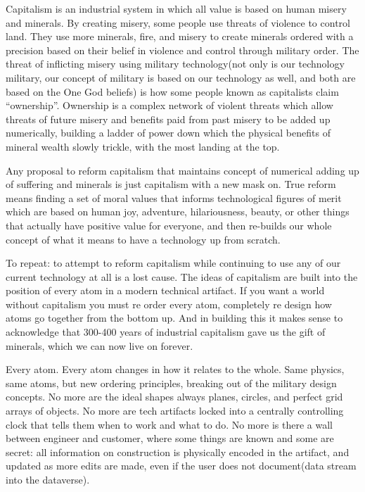 Capitalism is an industrial system in which all value is based on human
misery and minerals. By creating misery, some people use threats of
violence to control land. They use more minerals, fire, and misery to
create minerals ordered with a precision based on their belief in
violence and control through military order. The threat of inflicting
misery using military technology(not only is our technology military,
our concept of military is based on our technology as well, and both are
based on the One God beliefs) is how some people known as capitalists
claim ``ownership''. Ownership is a complex network of violent threats
which allow threats of future misery and benefits paid from past misery
to be added up numerically, building a ladder of power down which the
physical benefits of mineral wealth slowly trickle, with the most
landing at the top.

Any proposal to reform capitalism that maintains concept of numerical
adding up of suffering and minerals is just capitalism with a new mask
on. True reform means finding a set of moral values that informs
technological figures of merit which are based on human joy, adventure,
hilariousness, beauty, or other things that actually have positive value
for everyone, and then re-builds our whole concept of what it means to
have a technology up from scratch.

To repeat: to attempt to reform capitalism while continuing to use any
of our current technology at all is a lost cause. The ideas of
capitalism are built into the position of every atom in a modern
technical artifact. If you want a world without capitalism you must re
order every atom, completely re design how atoms go together from the
bottom up. And in building this it makes sense to acknowledge that
300-400 years of industrial capitalism gave us the gift of minerals,
which we can now live on forever.

Every atom. Every atom changes in how it relates to the whole. Same
physics, same atoms, but new ordering principles, breaking out of the
military design concepts. No more are the ideal shapes always planes,
circles, and perfect grid arrays of objects. No more are tech artifacts
locked into a centrally controlling clock that tells them when to work
and what to do. No more is there a wall between engineer and customer,
where some things are known and some are secret: all information on
construction is physically encoded in the artifact, and updated as more
edits are made, even if the user does not document(data stream into the
dataverse).


